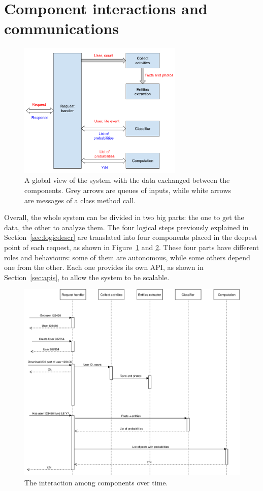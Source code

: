 \section{Component interactions and communications}
\label{sec:view}
\begin{figure}
\centering
\includegraphics[width=%
0.7\textwidth]{img/Globalview}
\caption{A global view of the system with the data exchanged between the components. Grey arrows are queues of inputs, while white arrows are messages of a class method call.}
\label{fig:globalview}
\end{figure}

Overall, the whole system can be divided in two big parts: the one to get the data, the other to analyze them. The four logical steps previously explained in Section~\ref{sec:logicdescr} are translated into four components placed in the deepest point of each request, as shown in Figure~\ref{fig:globalview} and \ref{fig:interaction}. These four parts have different roles and behaviours: some of them are autonomous, while some others depend one from the other. Each one provides its own API, as shown in Section~\ref{sec:apis}, to allow the system to be scalable.

\begin{figure}
\centering
\includegraphics[width=%
1\textwidth]{img/Interaction}
\caption{The interaction among components over time.}
\label{fig:interaction}
\end{figure}

